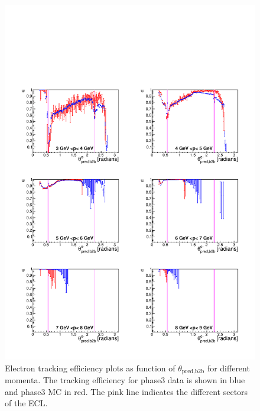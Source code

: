 \documentclass[a4paper,11pt,twosided,final,german,openbib,pdftex,listof=totoc,bibliography=totoc]{scrbook}
\begin{document}
\begin{figure}[!htbp]
	\centering
	\includegraphics[width=\textwidth]{Plots/master3/xPMThetaemP3}
	\caption[Momentum $\theta_{\textrm{pred,b2b}}$ Electron Efficiency Phase3]{Electron tracking efficiency plots as function of $\theta_{\textrm{pred,b2b}}$ for different momenta. The tracking efficiency for phase3 data is shown in blue and phase3 MC in red. The pink line indicates the different sectors of the ECL.}
	
	\label{plt:xPMThetaem3}
\end{figure}
\end{document}
